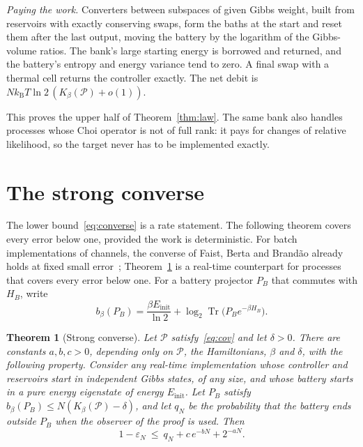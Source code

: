 \documentclass[11pt]{article}
\newtheorem{theorem}{Theorem}
\theoremstyle{definition}
\theoremstyle{remark}
\newcommand{\Tr}{\operatorname{Tr}}
\newcommand{\kB}{k_{\mathrm B}}
\newcommand{\Kb}{K_\beta}
\newcommand{\Pp}{\mathcal P}
\begin{document}
\emph{Paying the work.} Converters between subspaces of given Gibbs weight, built from reservoirs with exactly conserving swaps, form the baths at the start and reset them after the last output, moving the battery by the logarithm of the Gibbs-volume ratios. The bank's large starting energy is borrowed and returned, and the battery's entropy and energy variance tend to zero. A final swap with a thermal cell returns the controller exactly. The net debit is $N\kB T\ln2\,(\Kb(\Pp)+o(1))$.

This proves the upper half of Theorem~\ref{thm:law}. The same bank also handles processes whose Choi operator is not of full rank: it pays for changes of relative likelihood, so the target never has to be implemented exactly.

\section{The strong converse}\label{sec:converse}

The lower bound~\eqref{eq:converse} is a rate statement. The following theorem covers every error below one, provided the work is deterministic. For batch implementations of channels, the converse of Faist, Berta and Brand\~ao already holds at fixed small error~\cite[Prop.~4.2]{FBB21}; Theorem~\ref{thm:converse} is a real-time counterpart for processes that covers every error below one. For a battery projector $P_B$ that commutes with $H_B$, write
\[
b_\beta(P_B)=\frac{\beta E_{\mathrm{init}}}{\ln2}+\log_2\Tr\bigl(P_Be^{-\beta H_B}\bigr).
\]

\begin{theorem}[Strong converse]\label{thm:converse}
Let $\Pp$ satisfy~\eqref{eq:cov} and let $\delta>0$. There are constants $a,b,c>0$, depending only on $\Pp$, the Hamiltonians, $\beta$ and $\delta$, with the following property. Consider any real-time implementation whose controller and reservoirs start in independent Gibbs states, of any size, and whose battery starts in a pure energy eigenstate of energy $E_{\mathrm{init}}$. Let $P_B$ satisfy $b_\beta(P_B)\le N(\Kb(\Pp)-\delta)$, and let $q_N$ be the probability that the battery ends outside $P_B$ when the observer of the proof is used. Then
\[
1-\varepsilon_N\ \le\ q_N+c\,e^{-bN}+2^{-aN}.
\]
\end{theorem}
\end{document}
